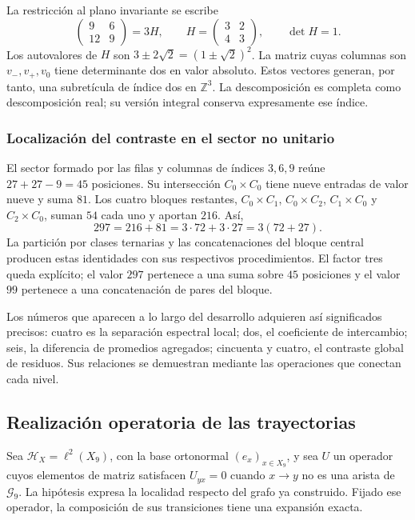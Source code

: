La restricción al plano invariante se escribe
\[
 \begin{pmatrix}9&6\\12&9\end{pmatrix}
 =3H,\qquad
 H=\begin{pmatrix}3&2\\4&3\end{pmatrix},\qquad\det H=1.
\]
Los autovalores de $H$ son $3\pm2\sqrt2=(1\pm\sqrt2)^2$. La matriz cuyas columnas son $v_-,v_+,v_0$ tiene determinante dos en valor absoluto. Estos vectores generan, por tanto, una subretícula de índice dos en $\mathbb Z^3$. La descomposición es completa como descomposición real; su versión integral conserva expresamente ese índice.

\subsubsection{Localización del contraste en el sector no unitario}

El sector formado por las filas y columnas de índices $3,6,9$ reúne $27+27-9=45$ posiciones. Su intersección $C_0\times C_0$ tiene nueve entradas de valor nueve y suma $81$. Los cuatro bloques restantes, $C_0\times C_1$, $C_0\times C_2$, $C_1\times C_0$ y $C_2\times C_0$, suman $54$ cada uno y aportan $216$. Así,
\[
 297=216+81=3\cdot72+3\cdot27=3(72+27).
\]
La partición por clases ternarias y las concatenaciones del bloque central producen estas identidades con sus respectivos procedimientos. El factor tres queda explícito; el valor $297$ pertenece a una suma sobre $45$ posiciones y el valor $99$ pertenece a una concatenación de pares del bloque.

Los números que aparecen a lo largo del desarrollo adquieren así significados precisos: cuatro es la separación espectral local; dos, el coeficiente de intercambio; seis, la diferencia de promedios agregados; cincuenta y cuatro, el contraste global de residuos. Sus relaciones se demuestran mediante las operaciones que conectan cada nivel.

\subsection{Realización operatoria de las trayectorias}
\label{geo:operadores-trayectorias}

Sea $\mathcal H_X=\ell^2(X_9)$, con la base ortonormal $(e_x)_{x\in X_9}$, y sea $U$ un operador cuyos elementos de matriz satisfacen $U_{yx}=0$ cuando $x\to y$ no es una arista de $\mathscr G_9$. La hipótesis expresa la localidad respecto del grafo ya construido. Fijado ese operador, la composición de sus transiciones tiene una expansión exacta.

